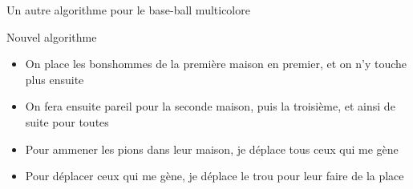 \documentclass[final,hyperref={pdfpagelabels=false}]{beamer}
\begin{document}
\begin{frame}{Un autre algorithme pour le base-ball multicolore}
  \begin{block}{Nouvel algorithme}
    \begin{itemize}
    \item On place les bonshommes de la première maison en premier, et on n'y
      touche plus ensuite
    \item On fera ensuite pareil pour la seconde maison, puis la troisième, et
      ainsi de suite pour toutes
    \item Pour ammener les pions  dans leur maison, je déplace tous
      ceux qui me gène
    \item Pour déplacer ceux qui me gène, je déplace le trou pour leur faire de
      la place
    \end{itemize}
  \end{block}
  \begin{columns}


\end{columns}
\end{frame}
\end{document}
